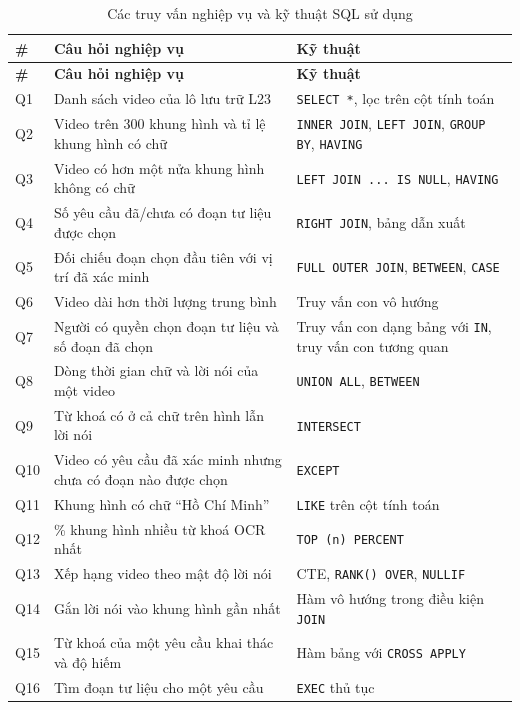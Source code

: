 \begin{longtable}{>{\raggedright\arraybackslash}p{0.85cm} >{\raggedright\arraybackslash}p{6.5cm} >{\raggedright\arraybackslash}p{6.5cm}}
\caption{Các truy vấn nghiệp vụ và kỹ thuật SQL sử dụng}\label{tab:queries}\\
\toprule \textbf{\#} & \textbf{Câu hỏi nghiệp vụ} & \textbf{Kỹ thuật} \\ \midrule \endfirsthead
\toprule \textbf{\#} & \textbf{Câu hỏi nghiệp vụ} & \textbf{Kỹ thuật} \\ \midrule \endhead
\bottomrule \endfoot
Q1 & Danh sách video của lô lưu trữ L23 & \texttt{SELECT *}, lọc trên cột tính toán \\
Q2 & Video trên 300 khung hình và tỉ lệ khung hình có chữ & \texttt{INNER JOIN}, \texttt{LEFT JOIN}, \texttt{GROUP BY}, \texttt{HAVING} \\
Q3 & Video có hơn một nửa khung hình không có chữ & \texttt{LEFT JOIN ... IS NULL}, \texttt{HAVING} \\
Q4 & Số yêu cầu đã/chưa có đoạn tư liệu được chọn & \texttt{RIGHT JOIN}, bảng dẫn xuất \\
Q5 & Đối chiếu đoạn chọn đầu tiên với vị trí đã xác minh & \texttt{FULL OUTER JOIN}, \texttt{BETWEEN}, \texttt{CASE} \\
Q6 & Video dài hơn thời lượng trung bình & Truy vấn con vô hướng \\
Q7 & Người có quyền chọn đoạn tư liệu và số đoạn đã chọn & Truy vấn con dạng bảng với \texttt{IN}, truy vấn con tương quan \\
Q8 & Dòng thời gian chữ và lời nói của một video & \texttt{UNION ALL}, \texttt{BETWEEN} \\
Q9 & Từ khoá có ở cả chữ trên hình lẫn lời nói & \texttt{INTERSECT} \\
Q10 & Video có yêu cầu đã xác minh nhưng chưa có đoạn nào được chọn & \texttt{EXCEPT} \\
Q11 & Khung hình có chữ ``Hồ Chí Minh'' & \texttt{LIKE} trên cột tính toán \\
Q12 & 1\% khung hình nhiều từ khoá OCR nhất & \texttt{TOP (n) PERCENT} \\
Q13 & Xếp hạng video theo mật độ lời nói & CTE, \texttt{RANK() OVER}, \texttt{NULLIF} \\
Q14 & Gắn lời nói vào khung hình gần nhất & Hàm vô hướng trong điều kiện \texttt{JOIN} \\
Q15 & Từ khoá của một yêu cầu khai thác và độ hiếm & Hàm bảng với \texttt{CROSS APPLY} \\
Q16 & Tìm đoạn tư liệu cho một yêu cầu & \texttt{EXEC} thủ tục \\

\end{longtable}
